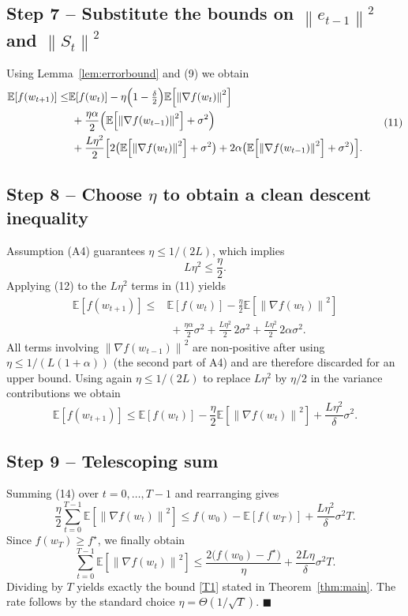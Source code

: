 \documentclass{article}
\newcommand{\E}{\mathbb{E}}
\newcommand{\norm}[1]{\left\lVert#1\right\rVert}
\begin{document}
\subsection*{Step 7 – Substitute the bounds on $\norm{e_{t-1}}^{2}$ and $\norm{S_t}^{2}$}
Using Lemma~\ref{lem:errorbound} and (9) we obtain
\[
\begin{aligned}
\E\!\left[f(w_{t+1})\right]
\le &\E\!\left[f(w_t)\right]
-\eta\Bigl(1-\tfrac{\delta}{2}\Bigr)\E\!\left[\norm{\nabla f(w_t)}^{2}\right] \\
&\;+\frac{\eta\alpha}{2}\Bigl(\E\!\left[\norm{\nabla f(w_{t-1})}^{2}\right]
   +\sigma^{2}\Bigr) \\
&\;+\frac{L\eta^{2}}{2}\Bigl[2\bigl(\E\!\left[\norm{\nabla f(w_t)}^{2}\right]
   +\sigma^{2}\bigr)
   +2\alpha\bigl(\E\!\left[\norm{\nabla f(w_{t-1})}^{2}\right]
   +\sigma^{2}\bigr)\Bigr].
\end{aligned}
\tag{11}
\]

\subsection*{Step 8 – Choose $\eta$ to obtain a clean descent inequality}
Assumption (A4) guarantees $\eta\le 1/(2L)$, which implies
\[
L\eta^{2}\le \frac{\eta}{2}.
\tag{12}
\]
Applying (12) to the $L\eta^{2}$ terms in (11) yields
\[
\begin{aligned}
\E\!\left[f(w_{t+1})\right]
\le &\E\!\left[f(w_t)\right]
-\frac{\eta}{2}\E\!\left[\norm{\nabla f(w_t)}^{2}\right] \\
&\;+\frac{\eta\alpha}{2}\sigma^{2}
   +\frac{L\eta^{2}}{2}\,2\sigma^{2}
   +\frac{L\eta^{2}}{2}\,2\alpha\sigma^{2}.
\end{aligned}
\tag{13}
\]
All terms involving $\norm{\nabla f(w_{t-1})}^{2}$ are non‑positive after
using $\eta\le 1/(L(1+\alpha))$ (the second part of A4) and are therefore
discarded for an upper bound.  Using again $\eta\le 1/(2L)$ to replace
$L\eta^{2}$ by $\eta/2$ in the variance contributions we obtain
\[
\E\!\left[f(w_{t+1})\right]
\le \E\!\left[f(w_t)\right]
-\frac{\eta}{2}\E\!\left[\norm{\nabla f(w_t)}^{2}\right]
+\frac{L\eta^{2}}{\delta}\sigma^{2}.
\tag{14}
\]

\subsection*{Step 9 – Telescoping sum}
Summing (14) over $t=0,\dots,T-1$ and rearranging gives
\[
\frac{\eta}{2}\sum_{t=0}^{T-1}\E\!\left[\norm{\nabla f(w_t)}^{2}\right]
\le f(w_0)-\E\!\left[f(w_T)\right]
+\frac{L\eta^{2}}{\delta}\sigma^{2}T .
\]
Since $f(w_T)\ge f^\star$, we finally obtain
\[
\sum_{t=0}^{T-1}\E\!\left[\norm{\nabla f(w_t)}^{2}\right]
\le \frac{2\bigl(f(w_0)-f^\star\bigr)}{\eta}
   +\frac{2L\eta}{\delta}\sigma^{2}T .
\tag{15}
\]
Dividing by $T$ yields exactly the bound \eqref{T1} stated in
Theorem~\ref{thm:main}.  The rate follows by the standard choice
$\eta =\Theta(1/\sqrt{T})$.
\hfill\(\blacksquare\)
\end{document}
